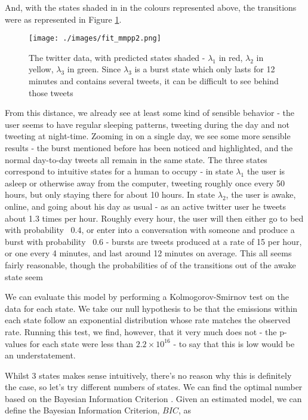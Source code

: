 And, with the states shaded in in the colours represented above, the transitions were as represented in Figure \ref{fit_mmpp2}.

\begin{figure}[h!]
\texttt{[image: ./images/fit\_mmpp2.png]}
\caption{The twitter data, with predicted states shaded - $\lambda_1$ in red, $\lambda_2$ in yellow, $\lambda_3$ in green. Since $\lambda_3$ is a burst state which only lasts for 12 minutes and contains several tweets, it can be difficult to see behind those tweets}
\label{fit_mmpp2}
\end{figure}

From this distance, we already see at least some kind of sensible behavior - the user seems to have regular sleeping patterns, tweeting during the day and not tweeting at night-time. Zooming in on a single day, we see some more sensible results - the burst mentioned before has been noticed and highlighted, and the normal day-to-day tweets all remain in the same state. The three states correspond to intuitive states for a human to occupy - in state $\lambda_1$ the user is asleep or otherwise away from the computer, tweeting roughly once every 50 hours, but only staying there for about 10 hours. In state $\lambda_2$, the user is awake, online, and going about his day as usual - as an active twitter user he tweets about 1.3 times per hour. Roughly every hour, the user will then either go to bed with probability ~$0.4$, or enter into a conversation with someone and produce a burst with probability ~$0.6$ - bursts are tweets produced at a rate of 15 per hour, or one every 4 minutes, and last around 12 minutes on average. This all seems fairly reasonable, though the probabilities of of the transitions out of the awake state seem

We can evaluate this model by performing a Kolmogorov-Smirnov test on the data for each state. We take our null hypothesis to be that the emissions within each state follow an exponential distribution whose rate matches the observed rate. Running this test, we find, however, that it very much does not - the p-values for each state were less than $2.2 \times 10^{16}$ - to say that this is low would be an understatement.

Whilst 3 states makes sense intuitively, there's no reason why this is definitely the case, so let's try different numbers of states. We can find the optimal number based on the Bayesian Information Criterion \cite{BIC}. Given an estimated model, we can define the Bayesian Information Criterion, $BIC$, as

